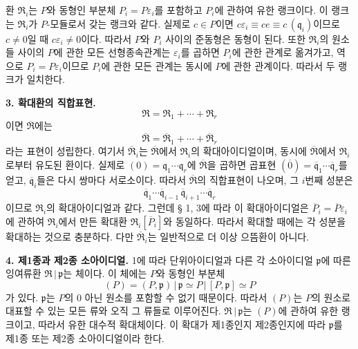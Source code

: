 환 \(\mathfrak R_i\)는 \(P\)와 동형인 부분체 \(P_i=P\varepsilon_i\)를 포함하고 \(P_i\)에 관하여 유한 랭크이다. 이 랭크는 \(\mathfrak R_i\)가 \(P\)-모듈로서 갖는 랭크와 같다. 실제로 \(c\in P\)이면 \(c\varepsilon_i\equiv ce\equiv c\,(\mathfrak q_i)\)이므로 \(c\ne0\)일 때 \(c\varepsilon_i\ne0\)이다. 따라서 \(P\)와 \(P_i\) 사이의 준동형은 동형이 된다. 또한 \(\mathfrak R_i\)의 원소들 사이의 \(P\)에 관한 모든 선형종속관계는 \(\varepsilon_i\)를 곱하면 \(P_i\)에 관한 관계로 옮겨가고, 역으로 \(P_i=P\varepsilon_i\)이므로 \(P_i\)에 관한 모든 관계는 동시에 \(P\)에 관한 관계이다. 따라서 두 랭크가 일치한다.

\textbf{3. 확대환의 직합표현.}
\[
   \mathfrak R=\mathfrak R_1+\cdots+\mathfrak R_r
\]
이면 \(\overline{\mathfrak R}\)에는
\[
   \overline{\mathfrak R}=\overline{\mathfrak R}_1+\cdots+\overline{\mathfrak R}_r
\]
라는 표현이 성립한다. 여기서 \(\overline{\mathfrak R}_i\)는 \(\overline{\mathfrak R}\)에서 \(\mathfrak R_i\)의 확대아이디얼이며, 동시에 \(\overline{\mathfrak R}\)에서 \(\mathfrak R_i\)로부터 유도된 환이다. 실제로 \((0)=\mathfrak q_1\cdots\mathfrak q_r\)에 \(\overline{\mathfrak R}\)을 곱하면 곱표현 \((\overline 0)=\overline{\mathfrak q}_1\cdots\overline{\mathfrak q}_r\)를 얻고, \(\overline{\mathfrak q}_i\)들은 다시 쌍마다 서로소이다. 따라서 \(\overline{\mathfrak R}\)의 직합표현이 나오며, 그 \(i\)번째 성분은
\[
   \overline{\mathfrak q}_1\cdots\overline{\mathfrak q}_{i-1}\,
   \overline{\mathfrak q}_{i+1}\cdots\overline{\mathfrak q}_r
\]
이므로 \(\mathfrak R_i\)의 확대아이디얼과 같다. 그런데 § 1, 3에 따라 이 확대아이디얼은 \(\overline P_i=\overline P\varepsilon_i\)에 관하여 \(\mathfrak R_i\)에서 만든 확대환 \(\mathfrak R_i[\overline P_i]\)와 동일하다. 따라서 확대할 때에는 각 성분을 확대하는 것으로 충분하다. 다만 \(\overline{\mathfrak R}_i\)는 일반적으로 더 이상 으뜸환이 아니다.

\textbf{4. 제1종과 제2종 소아이디얼.} 1에 따라 단위아이디얼과 다른 각 소아이디얼 \(\mathfrak p\)에 따른 잉여류환 \(\mathfrak R\,|\,\mathfrak p\)는 체이다. 이 체에는 \(P\)와 동형인 부분체
\[
(P)=(P,\mathfrak p)\,|\,\mathfrak p\simeq P\,|\,[P,\mathfrak p]\simeq P
\]
가 있다. \(\mathfrak p\)는 \(P\)의 0 아닌 원소를 포함할 수 없기 때문이다. 따라서 \((P)\)는 \(P\)의 원소로 대표할 수 있는 모든 류와 오직 그 류들로 이루어진다. \(\mathfrak R\,|\,\mathfrak p\)는 \((P)\)에 관하여 유한 랭크이고, 따라서 유한 대수적 확대체이다. 이 확대가 제1종인지 제2종인지에 따라 \(\mathfrak p\)를 제1종 또는 제2종 소아이디얼이라 한다.

